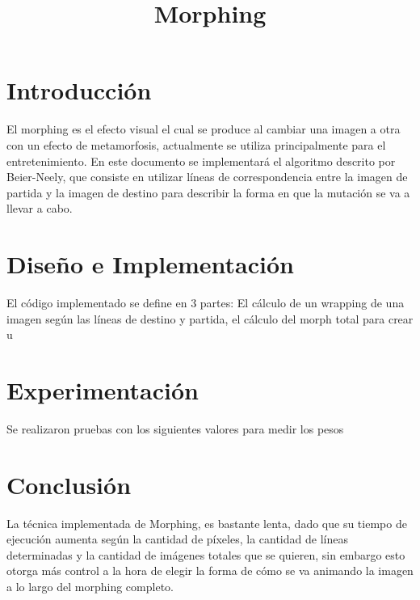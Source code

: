 \documentclass[conference]{IEEEtran}
\begin{document}
\title{Morphing}
\author{
}


\maketitle

\begin{abstract}
	
\end{abstract}
 

\section*{Introducción} %
	El morphing es el efecto visual el cual se produce al cambiar una imagen a otra con un efecto de metamorfosis, actualmente se utiliza principalmente para el entretenimiento. En este documento se implementará el algoritmo descrito por Beier-Neely, que consiste en utilizar líneas de correspondencia entre la imagen de partida y la imagen de destino para describir la forma en que la mutación se va a llevar a cabo.
	

\section*{Diseño e Implementación}
	El código implementado se define en 3 partes: El cálculo de un wrapping de una imagen según las líneas de destino y partida, el cálculo del morph total para crear u
\section*{Experimentación}
	Se realizaron pruebas con los siguientes valores para medir los pesos	
	
\section*{Conclusión}
	La técnica implementada de Morphing, es bastante lenta, dado que su tiempo de ejecución aumenta según la cantidad de píxeles, la cantidad de líneas determinadas y la cantidad de imágenes totales que se quieren, sin embargo esto otorga más control a la hora de elegir la forma de cómo se va animando la imagen a lo largo del morphing completo.
	
\begin{thebibliography}{99}

\end{thebibliography}
\end{document}
